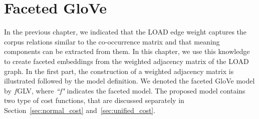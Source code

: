 \section{Faceted GloVe }\label{sec:faceted_glove}
In the previous chapter, we indicated that the LOAD edge weight captures the corpus relations similar to the co-occurrence matrix and that meaning components can be extracted from them. In this chapter, we use this knowledge to create faceted embeddings from the weighted adjacency matrix of the LOAD graph. In the first part, the construction of a weighted adjacency matrix is illustrated followed by the model definition. We denoted the faceted GloVe model by $f$GLV, where \emph{``f"} indicates the faceted model. The proposed model contains two type of cost functions, that are discussed separately in Section~\ref{sec:normal_cost} and~\ref{sec:unified_cost}. 
